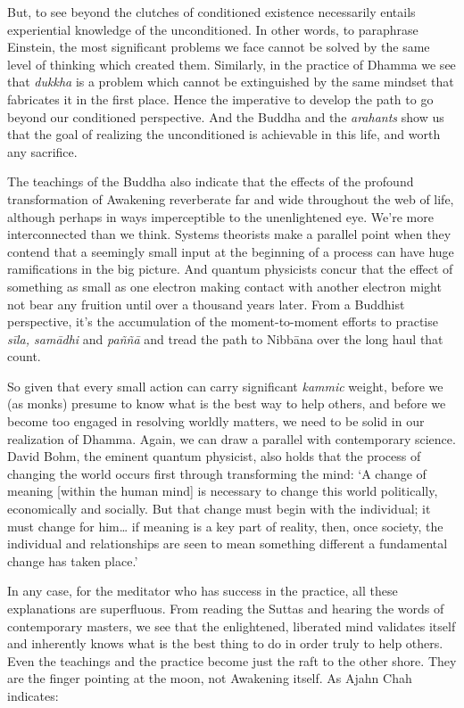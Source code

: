 But, to see beyond the clutches of conditioned existence necessarily
entails experiential knowledge of the unconditioned. In other words, to
paraphrase Einstein, the most significant problems we face cannot be
solved by the same level of thinking which created them. Similarly, in
the practice of Dhamma we see that \emph{dukkha} is a problem which
cannot be extinguished by the same mindset that fabricates it in the
first place. Hence the imperative to develop the path to go beyond our
conditioned perspective. And the Buddha and the \emph{arahants} show us
that the goal of realizing the unconditioned is achievable in this life,
and worth any sacrifice.

The teachings of the Buddha also indicate that the effects of the
profound transformation of Awakening reverberate far and wide throughout
the web of life, although perhaps in ways imperceptible to the
unenlightened eye. We're more interconnected than we think. Systems
theorists make a parallel point when they contend that a seemingly small
input at the beginning of a process can have huge ramifications in the
big picture. And quantum physicists concur that the effect of something
as small as one electron making contact with another electron might not
bear any fruition until over a thousand years later. From a Buddhist
perspective, it's the accumulation of the moment-to-moment efforts to
practise \emph{sīla, samādhi} and \emph{paññā} and tread the path to
Nibbāna over the long haul that count.

So given that every small action can carry significant \emph{kammic}
weight, before we (as monks) presume to know what is the best way to
help others, and before we become too engaged in resolving worldly
matters, we need to be solid in our realization of Dhamma. Again, we can
draw a parallel with contemporary science. David Bohm, the eminent
quantum physicist, also holds that the process of changing the world
occurs first through transforming the mind: `A change of meaning
{[}within the human mind{]} is necessary to change this world
politically, economically and socially. But that change must begin with
the individual; it must change for him\ldots{} if meaning is a key part
of reality, then, once society, the individual and relationships are
seen to mean something different a fundamental change has taken place.'

In any case, for the meditator who has success in the practice, all
these explanations are superfluous. From reading the Suttas and hearing
the words of contemporary masters, we see that the enlightened,
liberated mind validates itself and inherently knows what is the best
thing to do in order truly to help others. Even the teachings and the
practice become just the raft to the other shore. They are the finger
pointing at the moon, not Awakening itself. As Ajahn Chah indicates:

